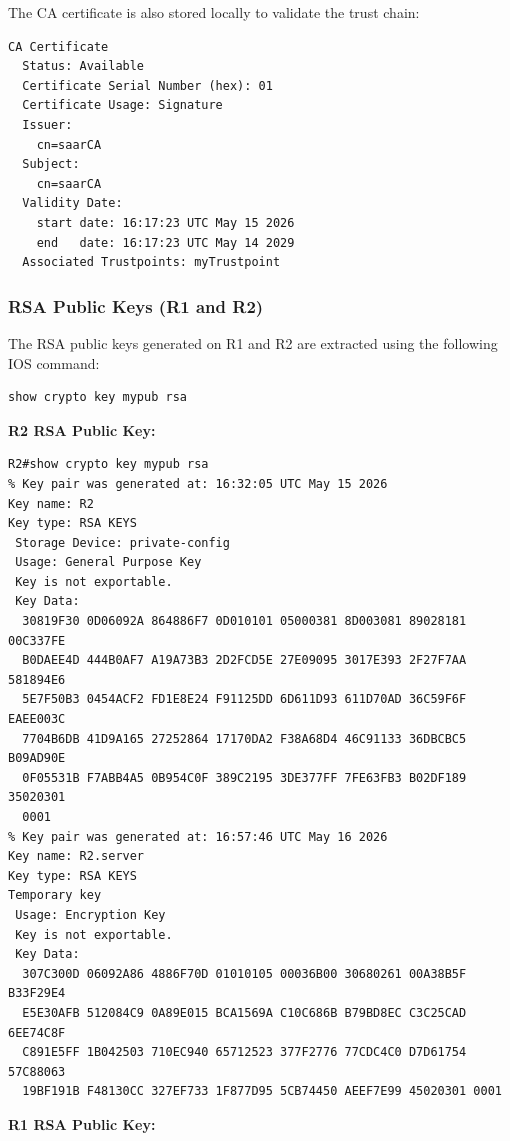 \documentclass[12pt]{article}
\begin{document}
The CA certificate is also stored locally to validate the trust chain:

\begin{verbatim}
CA Certificate
  Status: Available
  Certificate Serial Number (hex): 01
  Certificate Usage: Signature
  Issuer: 
    cn=saarCA
  Subject: 
    cn=saarCA
  Validity Date: 
    start date: 16:17:23 UTC May 15 2026
    end   date: 16:17:23 UTC May 14 2029
  Associated Trustpoints: myTrustpoint
\end{verbatim}

\subsubsection{RSA Public Keys (R1 and R2)}

The RSA public keys generated on R1 and R2 are extracted using the following IOS command:

\begin{verbatim}
show crypto key mypub rsa
\end{verbatim}

\textbf{R2 RSA Public Key:}

\begin{verbatim}
R2#show crypto key mypub rsa
% Key pair was generated at: 16:32:05 UTC May 15 2026
Key name: R2
Key type: RSA KEYS
 Storage Device: private-config
 Usage: General Purpose Key
 Key is not exportable.
 Key Data:
  30819F30 0D06092A 864886F7 0D010101 05000381 8D003081 89028181 00C337FE 
  B0DAEE4D 444B0AF7 A19A73B3 2D2FCD5E 27E09095 3017E393 2F27F7AA 581894E6 
  5E7F50B3 0454ACF2 FD1E8E24 F91125DD 6D611D93 611D70AD 36C59F6F EAEE003C 
  7704B6DB 41D9A165 27252864 17170DA2 F38A68D4 46C91133 36DBCBC5 B09AD90E 
  0F05531B F7ABB4A5 0B954C0F 389C2195 3DE377FF 7FE63FB3 B02DF189 35020301 
  0001
% Key pair was generated at: 16:57:46 UTC May 16 2026
Key name: R2.server
Key type: RSA KEYS
Temporary key
 Usage: Encryption Key
 Key is not exportable.
 Key Data:
  307C300D 06092A86 4886F70D 01010105 00036B00 30680261 00A38B5F B33F29E4 
  E5E30AFB 512084C9 0A89E015 BCA1569A C10C686B B79BD8EC C3C25CAD 6EE74C8F 
  C891E5FF 1B042503 710EC940 65712523 377F2776 77CDC4C0 D7D61754 57C88063 
  19BF191B F48130CC 327EF733 1F877D95 5CB74450 AEEF7E99 45020301 0001
\end{verbatim}

\textbf{R1 RSA Public Key:}
\end{document}
